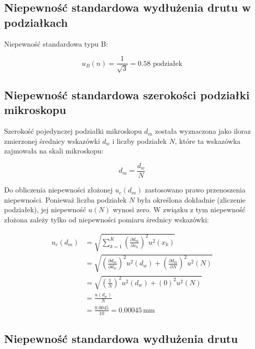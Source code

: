 \documentclass[a4paper,12pt]{article}
\begin{document}
\subsection{Niepewność standardowa wydłużenia drutu w podziałkach}

Niepewność standardowa typu B:

$$
    u_B(n) = \frac{1}{\sqrt{3}} = 0.58 \text{ podziałek}
$$




\subsection{Niepewność standardowa szerokości podziałki mikroskopu}

Szerokość pojedynczej podziałki mikroskopu $d_m$ została wyznaczona jako iloraz zmierzonej średnicy wskazówki $d_w$ i liczby podziałek $N$, które ta wskazówka zajmowała na skali mikroskopu:

\begin{equation}
    d_m = \frac{d_w}{N}
\end{equation}

Do obliczenia niepewności złożonej $u_c(d_m)$ zastosowano prawo przenoszenia niepewności. Ponieważ liczba podziałek $N$ była określona dokładnie (zliczenie podziałek), jej niepewność $u(N)$ wynosi zero. W związku z tym niepewność złożona zależy tylko od niepewności pomiaru średnicy wskazówki:

\begin{align*}
    u_c(d_m) & = \sqrt{\sum_{k=1}^{K} \left( \frac{\partial d_m}{\partial x_k} \right)^2 u^2(x_k)}                                        \\
             & = \sqrt{\left(\frac{\partial d_m}{\partial d_w}\right)^2 u^2(d_w) + \left(\frac{\partial d_m}{\partial N}\right)^2 u^2(N)} \\
             & = \sqrt{\left(\frac{1}{N}\right)^2 u^2(d_w) + \left(0\right)^2 u^2(N)}                                                     \\
             & = \frac{u(d_w)}{N}                                                                                                         \\
             & = \frac{0.0045}{10} = 0.00045\,\text{mm}
\end{align*}

\subsection{Niepewność standardowa wydłużenia drutu}
\end{document}
